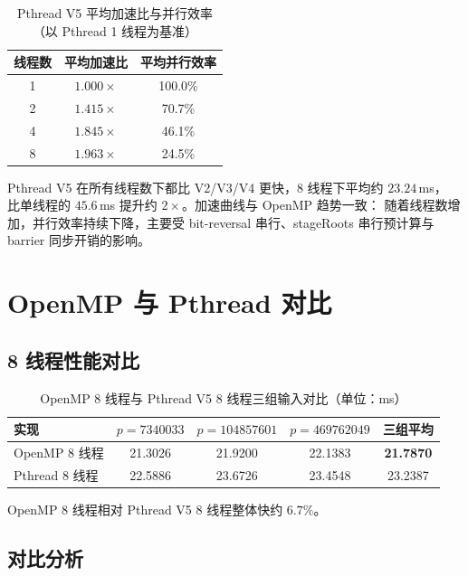 \documentclass[UTF8,a4paper,10pt]{ctexart}
\begin{document}
\begin{table}[H]
  \centering
  \begin{tabular}{ccc}
  \toprule  
  \textbf{线程数} & \textbf{平均加速比} & \textbf{平均并行效率}\\
  \midrule
  1 & $1.000\times$ & 100.0\% \\
  2 & $1.415\times$ & 70.7\%  \\
  4 & $1.845\times$ & 46.1\%  \\
  8 & $1.963\times$ & 24.5\%  \\
  \bottomrule
  \end{tabular}
  \caption{Pthread V5 平均加速比与并行效率（以 Pthread 1 线程为基准）}
  \label{tab:pthread-speedup}
\end{table}

Pthread V5 在所有线程数下都比 V2/V3/V4 更快，8 线程下平均约 $23.24$\,ms，
比单线程的 $45.6$\,ms 提升约 $2\times$。加速曲线与 OpenMP 趋势一致：
随着线程数增加，并行效率持续下降，主要受 bit-reversal 串行、stageRoots
串行预计算与 barrier 同步开销的影响。

\section{OpenMP 与 Pthread 对比}

\subsection{8 线程性能对比}

\begin{table}[H]
  \centering
  \begin{tabular}{lcccc}
  \toprule  
  \textbf{实现}   & $p=7340033$ & $p=104857601$ & $p=469762049$ & \textbf{三组平均}\\
  \midrule
  OpenMP 8 线程  & 21.3026 & 21.9200 & 22.1383 & \textbf{21.7870} \\
  Pthread 8 线程 & 22.5886 & 23.6726 & 23.4548 & 23.2387 \\
  \bottomrule
  \end{tabular}
  \caption{OpenMP 8 线程与 Pthread V5 8 线程三组输入对比（单位：ms）}
  \label{tab:omp-vs-pthread}
\end{table}

OpenMP 8 线程相对 Pthread V5 8 线程整体快约 $6.7\%$。

\subsection{对比分析}
\end{document}
